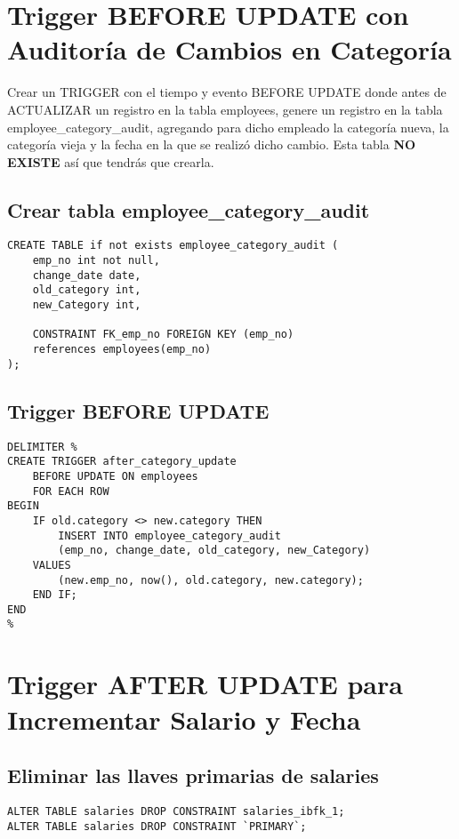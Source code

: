 \documentclass[11pt]{article}
\begin{document}
\section{Trigger BEFORE UPDATE con Auditoría de Cambios en Categoría}
\label{sec:org7c77511}
Crear un TRIGGER con el tiempo y evento BEFORE UPDATE donde antes de ACTUALIZAR
un registro en la tabla employees, genere un registro en la tabla 
employee\_category\_audit, agregando para dicho empleado la categoría nueva, la 
categoría vieja y la fecha en la que se realizó dicho cambio. Esta tabla 
\textbf{NO EXISTE} así que tendrás que crearla.

\subsection{Crear tabla employee\_category\_audit}
\label{sec:orgfda5578}
\begin{verbatim}
CREATE TABLE if not exists employee_category_audit (
    emp_no int not null,
    change_date date,
    old_category int,
    new_Category int,

    CONSTRAINT FK_emp_no FOREIGN KEY (emp_no) 
    references employees(emp_no)
);  
\end{verbatim}

\subsection{Trigger BEFORE UPDATE}
\label{sec:org357f41d}
\begin{verbatim}
DELIMITER %
CREATE TRIGGER after_category_update
    BEFORE UPDATE ON employees
    FOR EACH ROW
BEGIN
    IF old.category <> new.category THEN
        INSERT INTO employee_category_audit
        (emp_no, change_date, old_category, new_Category)
    VALUES
        (new.emp_no, now(), old.category, new.category);
    END IF;
END
%
\end{verbatim}

\section{Trigger AFTER UPDATE para Incrementar Salario y Fecha}
\label{sec:org3101bac}
\subsection{Eliminar las llaves primarias de salaries}
\label{sec:org7d4f30d}
\begin{verbatim}
ALTER TABLE salaries DROP CONSTRAINT salaries_ibfk_1;
ALTER TABLE salaries DROP CONSTRAINT `PRIMARY`;
\end{verbatim}
\end{document}
